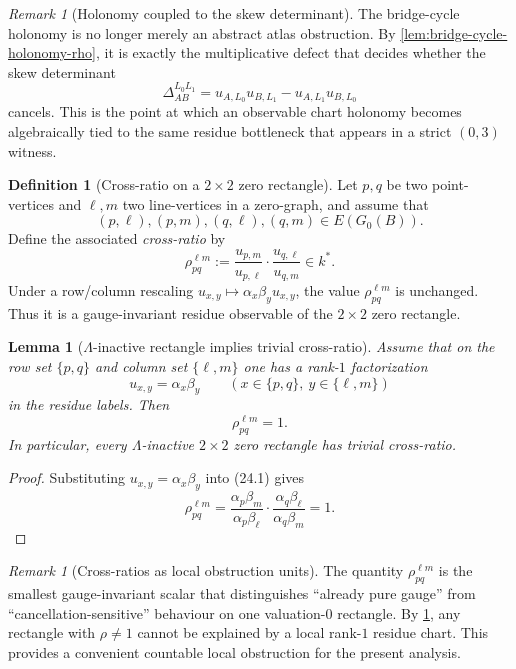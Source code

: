 \documentclass[11pt]{amsart}
\numberwithin{equation}{section}
\theoremstyle{plain}
\newtheorem{lemma}[theorem]{Lemma}
\theoremstyle{definition}
\newtheorem{definition}[theorem]{Definition}
\theoremstyle{remark}
\newtheorem{remark}[theorem]{Remark}
\newcommand{\Lam}{\Lambda}
\begin{document}
\begin{remark}[Holonomy coupled to the skew determinant]
The bridge-cycle holonomy is no longer merely an abstract atlas obstruction. By \cref{lem:bridge-cycle-holonomy-rho}, it is exactly the multiplicative defect that decides whether the skew determinant
\[
\Delta_{AB}^{L_0L_1}=u_{A,L_0}u_{B,L_1}-u_{A,L_1}u_{B,L_0}
\]
cancels. This is the point at which an observable chart holonomy becomes algebraically tied to the same residue bottleneck that appears in a strict $(0,3)$ witness.
\end{remark}

\begin{definition}[Cross-ratio on a $2\times2$ zero rectangle]
\label{def:cross-ratio-rectangle}
Let $p,q$ be two point-vertices and $\ell,m$ two line-vertices in a zero-graph, and assume that
\[(p,\ell),(p,m),(q,\ell),(q,m)\in E(G_0(B)).\]
Define the associated \emph{cross-ratio} by
\[
\rho_{pq}^{\ell m}:=\frac{u_{p,m}}{u_{p,\ell}}\cdot\frac{u_{q,\ell}}{u_{q,m}}\in k^*.
\tag{24.1}
\]
Under a row/column rescaling $u_{x,y}\mapsto \alpha_x\beta_y u_{x,y}$, the value $\rho_{pq}^{\ell m}$ is unchanged. Thus it is a gauge-invariant residue observable of the $2\times2$ zero rectangle.
\end{definition}

\begin{lemma}[$\Lam$-inactive rectangle implies trivial cross-ratio]
\label{lem:lam-inactive-implies-rho1}
Assume that on the row set $\{p,q\}$ and column set $\{\ell,m\}$ one has a rank-$1$ factorization
\[u_{x,y}=\alpha_x\beta_y
\qquad(x\in\{p,q\},\ y\in\{\ell,m\})\]
in the residue labels. Then
\[
\rho_{pq}^{\ell m}=1.
\tag{24.2}
\]
In particular, every $\Lam$-inactive $2\times2$ zero rectangle has trivial cross-ratio.
\end{lemma}

\begin{proof}
Substituting $u_{x,y}=\alpha_x\beta_y$ into \textup{(24.1)} gives
\[
\rho_{pq}^{\ell m}=\frac{\alpha_p\beta_m}{\alpha_p\beta_\ell}\cdot\frac{\alpha_q\beta_\ell}{\alpha_q\beta_m}=1.
\]
\end{proof}

\begin{remark}[Cross-ratios as local obstruction units]
\label{rem:cross-ratio-atomic-obstruction}
The quantity $\rho_{pq}^{\ell m}$ is the smallest gauge-invariant scalar that distinguishes ``already pure gauge'' from ``cancellation-sensitive'' behaviour on one valuation-$0$ rectangle. By \cref{lem:lam-inactive-implies-rho1}, any rectangle with $\rho\neq1$ cannot be explained by a local rank-$1$ residue chart. This provides a convenient countable local obstruction for the present analysis.
\end{remark}
\end{document}
